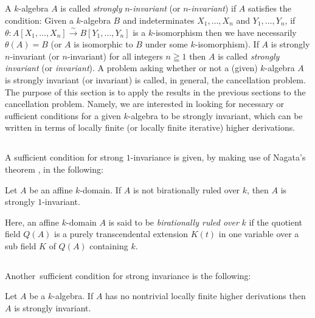 \subsection{}\label{chap1:6.1} 
A $k$-algebra $A$ is called {\em strongly}
$n$-{\em invariant} (or $n$-{\em invariant}) if $A$ satisfies the
condition: Given a $k$-algebra $B$ and indeterminates
$X_{1},\ldots,X_{n}$ and $Y_{1},\ldots,Y_{n}$, if
$\theta:A[X_{1},\ldots,X_{n}]\xrightarrow{\sim}B[Y_{1},\ldots,Y_{n}]$
is a $k$-isomorphism then we have necessarily $\theta(A)=B$ (or $A$ is
isomorphic to $B$ under some $k$-isomorphism). If $A$ is strongly
$n$-invariant (or $n$-invariant) for all integers $n\geqq 1$ then $A$
is called {\em strongly invariant} (or {\em invariant}). A problem
asking whether or not a (given) $k$-algebra $A$ is strongly invariant
(or invariant) is called, in general, the cancellation problem. The
purpose of this section is to apply the results in the previous
sections to the cancellation problem. Namely, we are interested in
looking for necessary or sufficient conditions for a given $k$-algebra
to be strongly invariant, which can be written in terms of locally
finite (or locally finite iterative) higher derivations.

\subsection{}\label{chap1:6.2}
A sufficient condition for strong $1$-invariance is given, by making
use of Nagata's theorem \cite{42}, in the following:

\begin{lemma*}[(\cf \cite{1}) ]
Let $A$ be an affine $k$-domain. If $A$ is not birationally ruled over
$k$, then $A$ is strongly $1$-invariant.
\end{lemma*}

Here, an affine $k$-domain $A$ is said to be {\em birationally ruled
  over} $k$ if the quotient field $Q(A)$ is a purely transcendental
extension $K(t)$ in one variable over a sub field $K$ of $Q(A)$
containing $k$. 

\subsection{}\label{chap1:6.3}
Another\pageoriginale\ sufficient condition for strong invariance is
the following:

\begin{lemma*}
Let $A$ be a $k$-algebra. If $A$ has no nontrivial locally finite
higher derivations then $A$ is strongly invariant.
\end{lemma*}

